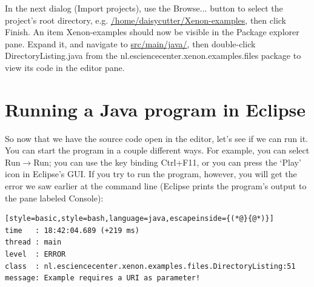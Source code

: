 \documentclass[12pt, a4paper, twoside, openany, titlepage]{book}
\begin{document}
In the next dialog (\textsf{Import projects}), use the \textsf{Browse...} button to select the project's root directory, e.g. \url{/home/daisycutter/Xenon-examples}, then click \textsf{Finish}. An item \textsf{Xenon-examples} should now be visible in the \textsf{Package explorer} pane. Expand it, and navigate to \url{src/main/java/}, then double-click \textsf{DirectoryListing.java} from the \textsf{nl.esciencecenter.xenon.examples.files} package to view its code in the editor pane.




\section{Running a Java program in Eclipse}


So now that we have the source code open in the editor, let's see if we can run it. You can start the program in a couple different ways. For example, you can select \textsf{Run}$\rightarrow$\textsf{Run}; you can use the key binding \textsf{Ctrl+F11}, or you can press the `Play' icon in Eclipse's GUI. If you try to run the program, however, you will get the error we saw earlier at the command line (Eclipse prints the program's output to the pane labeled \textsf{Console}):
\begin{lstlisting}[style=basic,style=bash,language=java,escapeinside={(*@}{@*)}]
time   : 18:42:04.689 (+219 ms)
thread : main
level  : ERROR
class  : nl.esciencecenter.xenon.examples.files.DirectoryListing:51
message: Example requires a URI as parameter!
\end{lstlisting}
\end{document}
